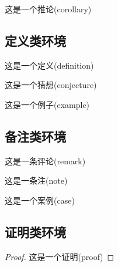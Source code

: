 \documentclass[cn,hazy,blue,11pt,device=normal,chinesefont=founder]{elegantnote}
\begin{document}
\begin{corollary}[名称]
  这是一个推论(corollary)
\end{corollary}

\subsection{定义类环境}

\begin{definition}[名称]
  这是一个定义(definition)
\end{definition}

\begin{conjecture}[名称]
  这是一个猜想(conjecture)
\end{conjecture}

\begin{example}[名称]
  这是一个例子(example)
\end{example}

\subsection{备注类环境}

\begin{remark}[名称]
  这是一条评论(remark)
\end{remark}

\begin{note}[名称]
  这是一条注(note)
\end{note}

\begin{case}[名称]
  这是一个案例(case)
\end{case}

\subsection{证明类环境}

\begin{proof}
  这是一个证明(proof)
\end{proof}
\end{document}
